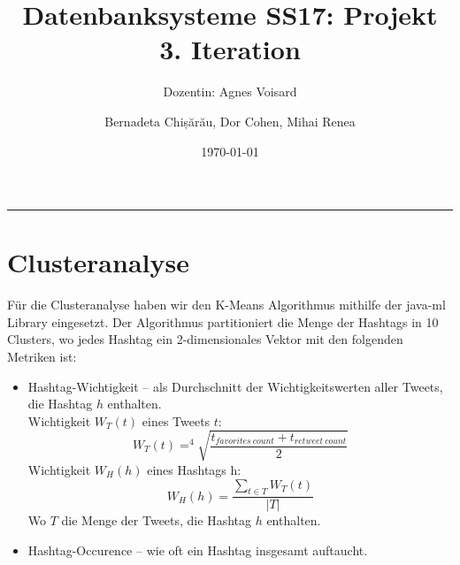\documentclass[paper=a4, english, ngerman, romanian]{scrartcl}
\begin{document}
\begin{titlepage}
	\title{Datenbanksysteme SS17: Projekt\\ 3. Iteration}	
	\subtitle{Dozentin: Agnes Voisard}
	\author{Bernadeta Chișărău, Dor Cohen, Mihai Renea}
	\date{\normalsize \today}
\end{titlepage}

\maketitle								%
\vspace*{-8cm}							%

\vspace{7cm}							%
\rule{\linewidth}{0.8pt}				%
	\section{Clusteranalyse}
		Für die Clusteranalyse haben wir den K-Means Algorithmus mithilfe der java-ml Library eingesetzt. Der Algorithmus partitioniert die Menge der Hashtags in 10 Clusters, wo jedes Hashtag ein 2-dimensionales Vektor mit den folgenden Metriken ist:
		\begin{itemize}
			\item Hashtag-Wichtigkeit -- als Durchschnitt der Wichtigkeitswerten aller Tweets, die Hashtag $h$ enthalten.\\
			Wichtigkeit $W_T(t)$ eines Tweets $t$:\\
			\begin{equation*}
				W_T(t) = ^4\sqrt{\frac{t_{favorites\ count} + t_{retweet\ count}}{2}}
			\end{equation*}
			Wichtigkeit $W_H(h)$ eines Hashtags h:
			\begin{equation*}
				W_H(h) = \frac{\sum_{t \in T} W_T(t)}{|T|}
			\end{equation*}
			Wo $T$ die Menge der Tweets, die Hashtag $h$ enthalten.
			
			\item Hashtag-Occurence -- wie oft ein Hashtag insgesamt auftaucht.
		\end{itemize}
		
\end{document}
